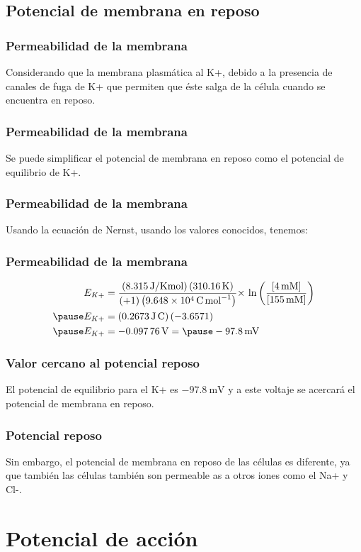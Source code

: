 \documentclass[14pt]{beamer}
\begin{document}
\subsection{Potencial de membrana en reposo}

\begin{frame}
\frametitle{Permeabilidad de la membrana}
Considerando que la membrana plasmática  al K+, \pause debido a la presencia de canales de fuga de K+ que permiten que éste salga de la célula cuando se encuentra en reposo.
\end{frame}
\begin{frame}
\frametitle{Permeabilidad de la membrana}
Se puede simplificar el potencial de membrana en reposo como el potencial de equilibrio de K+.
\end{frame}
\begin{frame}
\frametitle{Permeabilidad de la membrana}
Usando la ecuación de Nernst, usando los valores conocidos, tenemos:
\end{frame}
\begin{frame}
\frametitle{Permeabilidad de la membrana}
\begin{eqnarray*}
\begin{aligned}
E_{K+} &= \dfrac{\left( \SI{8.315}{\joule\per{\kelvin\mol}} \right) \left( \SI{310.16}{\kelvin} \right) }{(+1)\left( \SI{9.648d4}{\coulomb\per\mol} \right)} {\times} \, \ln   \left( \dfrac{\left[ 4 \, \text{mM} \right]}{\left[ 155 \, \text{mM} \right]} \right) \\ \pause
E_{K+} &= \left( \SI{0.2673}{\joule\coulomb} \right) \left( -3.6571 \right) \\ \pause
E_{K+} &= -\SI{0.09776}{\volt} = \pause -\SI{97.8}{\milli\volt}
\end{aligned}
\end{eqnarray*}
\end{frame}
\begin{frame}
\frametitle{Valor cercano al potencial reposo}
El potencial de equilibrio para el K+ es $-\SI{97.8}{\milli\volt}$ \pause y a este voltaje se acercará el potencial de membrana en reposo.
\end{frame}
\begin{frame}
\frametitle{Potencial reposo}
Sin embargo, el potencial de membrana en reposo de las células es diferente, ya que también las células también son permeable as a otros iones como el Na+ y Cl-.
\end{frame}

\section{Potencial de acción}
\end{document}
